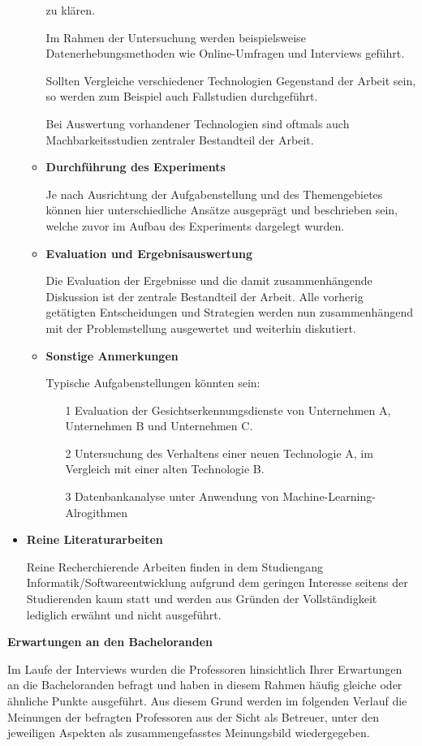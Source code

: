 \documentclass{scrreprt}
\begin{document}
\begin{itemize}
\begin{itemize}
	zu klären. 
	\par Im Rahmen der Untersuchung werden beispielsweise Datenerhebungsmethoden wie 
	Online-Umfragen und Interviews geführt. 
	\par Sollten Vergleiche verschiedener Technologien 
	Gegenstand der Arbeit sein, so werden zum Beispiel auch Fallstudien durchgeführt. 
	\par Bei Auswertung vorhandener Technologien sind oftmals auch Machbarkeitsstudien zentraler 
	Bestandteil der Arbeit.
	\item \textbf{Durchführung des Experiments}
	\par Je nach Ausrichtung der Aufgabenstellung und des Themengebietes können hier 
	unterschiedliche Ansätze ausgeprägt und beschrieben sein, welche zuvor im Aufbau des 
	Experiments dargelegt wurden. 
	\item \textbf{Evaluation und Ergebnisauswertung}
	\par Die Evaluation der Ergebnisse und die damit zusammenhängende Diskussion ist der 
	zentrale Bestandteil der Arbeit. Alle vorherig getätigten Entscheidungen und Strategien 
	werden nun zusammenhängend mit der Problemstellung ausgewertet und weiterhin diskutiert. 
	\item \textbf{Sonstige Anmerkungen}
	\par Typische Aufgabenstellungen könnten sein:
	\begin{itemize}
		\item[1] Evaluation der Gesichtserkennungsdienste von Unternehmen A, Unternehmen B und 
		Unternehmen C.
		\item[2] Untersuchung des Verhaltens einer neuen Technologie A, im Vergleich mit einer 
		alten Technologie B.
		\item[3] Datenbankanalyse unter Anwendung von Machine-Learning-Alrogithmen
	\end{itemize}
	\end{itemize}
\item \textbf{Reine Literaturarbeiten}
\par Reine Recherchierende Arbeiten finden in dem Studiengang Informatik/Softwareentwicklung aufgrund dem geringen Interesse seitens der Studierenden kaum statt und werden aus Gründen der Vollständigkeit lediglich erwähnt und nicht ausgeführt.
\end{itemize}

\textbf{Erwartungen an den Bacheloranden}
\par Im Laufe der Interviews wurden die Professoren hinsichtlich Ihrer Erwartungen an die Bacheloranden befragt und haben in diesem Rahmen häufig gleiche oder ähnliche Punkte ausgeführt. Aus diesem Grund werden im folgenden Verlauf die Meinungen der befragten Professoren aus der Sicht als Betreuer, unter den jeweiligen Aspekten als zusammengefasstes Meinungsbild wiedergegeben.\\
\end{document}
